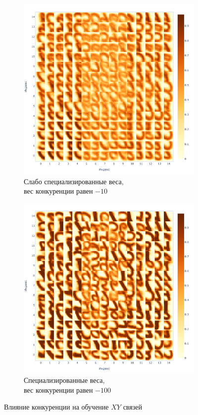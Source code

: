 \documentclass[a4paper]{article}
\begin{document}
\begin{figure}[H]
\centering
\begin{subfigure}{0.45\textwidth}
    \includegraphics[width=\textwidth,keepaspectratio=true]{weights_XY_bad_ru.pdf}
    \caption{Слабо специализированные веса,\\ вес конкуренции равен $-10$}
\end{subfigure}
\begin{subfigure}{0.45\textwidth}
    \includegraphics[width=\textwidth,keepaspectratio=true]{weights_XY_good_ru.pdf}
    \caption{Специализированные веса,\\ вес конкуренции равен $-100$}
\end{subfigure}
\caption{Влияние конкуренции на обучение $XY$ связей}
\end{figure}
\end{document}
